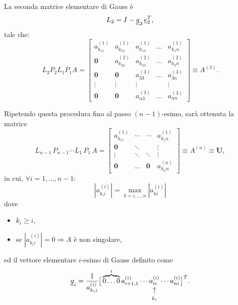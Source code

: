 La seconda matrice elementare di Gauss è
\begin{equation*}
    L_2 = I - \uline g_2\, \uline e_2^T,
\end{equation*}
tale che:
\begin{equation*}
    L_2 P_2 L_1 P_1 A = 
    \begin{bmatrix}
        a_{k_11}^{(1)} & a_{k_12}^{(1)} & a_{k_13}^{(1)} & \hdots & a_{k_1n}^{(1)}\\
        \boldsymbol 0 & a_{k_22}^{(2)} & a_{k_23}^{(2)} & \hdots & a_{k_2n}^{(2)}\\
        \boldsymbol 0 & \boldsymbol 0 & a_{33}^{(3)} & \hdots & a_{3n}^{(3)}\\
        \boldsymbol\vdots & \boldsymbol\vdots & \vdots & &\vdots\\
        \boldsymbol 0 & \boldsymbol 0 & a_{n3}^{(3)} & \hdots & a_{nn}^{(3)}
    \end{bmatrix}\equiv A^{(3)}.
\end{equation*}

Ripetendo questa procedura fino al passo $(n-1)$-esimo, sarà ottenuta la matrice
\begin{equation}\label{eq:Uperm}
    L_{n-1}\, P_{n-1} \cdots L_1\, P_1\, A = 
    \begin{bmatrix}
        a_{k_11}^{(1)} & \cdots & \cdots & a_{k_1n}^{(1)}\\
        \boldsymbol 0 & \ddots & & \vdots\\
        \boldsymbol\vdots & \boldsymbol\ddots &\ddots &\vdots\\
        \boldsymbol 0 & \boldsymbol\hdots & \boldsymbol 0 & a_{k_nn}^{(n)}
    \end{bmatrix}\equiv A^{(n)}\equiv \boldsymbol U,
\end{equation}
in cui, $\forall i=1,\hdots, n-1:$
\begin{equation*}
    \left|a_{k_ii}^{(i)}\right|=\underset{k=i,\hdots, n}{\max}\left|a_{ki}^{(i)}\right|
\end{equation*}
dove
\begin{itemize}
    \item $k_i\geq i$,
    \item se $\left|a_{k_i i}^{(i)}\right|=0\Rightarrow A$ è non \gls{singolare},
\end{itemize}
ed il vettore elementare $i$-esimo di Gauss definito come
\begin{equation*}
    \uline g_i=\frac{1}{a_{k_ii}^{(i)}}\big[\overbrace{0\hdots 0}^{i}a_{i+1, 1}^{(i)}\cdots \vrightarrowup{a_{ii}^{(i)}}{k_i}\cdots a_{ni}^{(i)}\big]^T.
\end{equation*}

